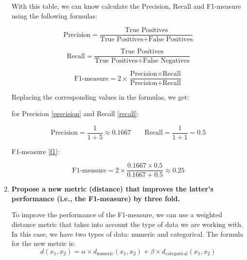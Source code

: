 \documentclass[12pt]{article}
\begin{document}
\begin{enumerate}[leftmargin=\labelsep]
    With this table, we can know calculate the Precision, Recall and F1-measure using the following formulas:

    \begin{equation}\label{precision}
        \text{Precision} = \frac{\text{True Positives}}{{\text{True Positives} +
        \text{False Positives}}}
    \end{equation}

    \begin{equation}\label{recall}
        \text{Recall} = \frac{\text{True Positives}}{{\text{True Positives} + \text{False Negatives}}}
    \end{equation}

    \begin{equation}\label{f1}
        \text{F1-measure} = 2 \times \frac{{\text{Precision} \times \text{Recall}}}{{\text{Precision} + \text{Recall}}}
    \end{equation}

    \vspace{10pt}
    Replacing the corresponding values in the formulas, we get:

    \vspace{10pt}
    for Precision \eqref{precision} and Recall \eqref{recall}:

    \begin{equation*}
        \text{Precision} = \frac{1}{1 + 5} \approx 0.1667 \quad \quad
        \text{Recall} = \frac{1}{1 + 1} = 0.5
    \end{equation*}

    F1-measure \eqref{f1}:

    \begin{equation*}
        \text{F1-measure} = 2 \times \frac{0.1667 \times 0.5}{0.1667 + 0.5} \approx 0.25
    \end{equation*}

    \newpage
    \item \textbf{Propose a new metric (distance) that improves the latter's performance (i.e., the
    F1-measure) by three fold.} 
    
    \vspace{10pt}
    
    To improve the performance of the F1-measure, we can use a weighted distance metric that takes into account the type of data we are working with. In this case, we have two types of data: numeric and categorical. The formula for the new metric is:
    \begin{equation*}
        d(x_1,x_2) = \alpha \times d_\text{numeric}(x_1,x_2) + \beta \times d_\text{categorical}(x_1,x_2)
    \end{equation*}


\end{enumerate}
\end{document}
